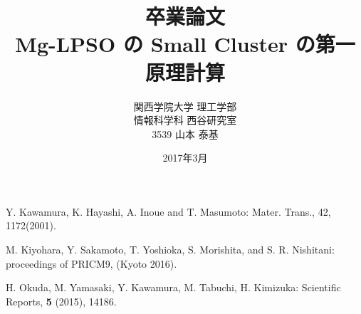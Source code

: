 \documentclass[12pt,a4]{jreport}%
\title{卒業論文\\Mg-LPSO の Small Cluster の第一原理計算}
\author{関西学院大学 理工学部\\情報科学科 西谷研究室\\3539 山本 泰基}
\date{2017年3月}
\begin{document}
\maketitle
\newpage



\tableofcontents



\begin{thebibliography}{9}
Y. Kawamura, K. Hayashi, A. Inoue and T. Masumoto: Mater. Trans., 42, 1172(2001).

 M. Kiyohara, Y. Sakamoto, T. Yoshioka, S. Morishita, and S. R. Nishitani: proceedings of PRICM9, (Kyoto 2016).

 H. Okuda, M. Yamasaki, Y. Kawamura, M. Tabuchi, H. Kimizuka: Scientific Reports, {\bf5} (2015), 14186.
\end{thebibliography}
\end{document}
